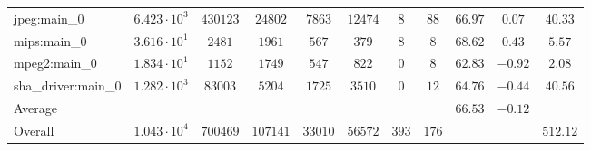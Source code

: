 \begin{tabular}{|l|c|c|c|c|c|c|c|c|c|c|}
jpeg:main\_0            & $ 6.423 \cdot 10^{3} $ & $ 430123 $ & $ 24802  $ & $ 7863  $ & $ 12474 $ & $ 8   $ & $ 88  $ & $ 66.97       $ & $ 0.07    $ & $ 40.33   $ \\
mips:main\_0            & $ 3.616 \cdot 10^{1} $ & $ 2481   $ & $ 1961   $ & $ 567   $ & $ 379   $ & $ 8   $ & $ 8   $ & $ 68.62       $ & $ 0.43    $ & $ 5.57    $ \\
mpeg2:main\_0           & $ 1.834 \cdot 10^{1} $ & $ 1152   $ & $ 1749   $ & $ 547   $ & $ 822   $ & $ 0   $ & $ 8   $ & $ 62.83       $ & $ -0.92   $ & $ 2.08    $ \\
sha\_driver:main\_0     & $ 1.282 \cdot 10^{3} $ & $ 83003  $ & $ 5204   $ & $ 1725  $ & $ 3510  $ & $ 0   $ & $ 12  $ & $ 64.76       $ & $ -0.44   $ & $ 40.56   $ \\
\hline
Average                 & $                    $ & $        $ & $        $ & $       $ & $       $ & $     $ & $     $ & $ 66.53       $ & $ -0.12   $ & $         $ \\
\hline
Overall                 & $ 1.043 \cdot 10^{4} $ & $ 700469 $ & $ 107141 $ & $ 33010 $ & $ 56572 $ & $ 393 $ & $ 176 $ & $             $ & $         $ & $ 512.12  $ \\
\hline
\end{tabular}
